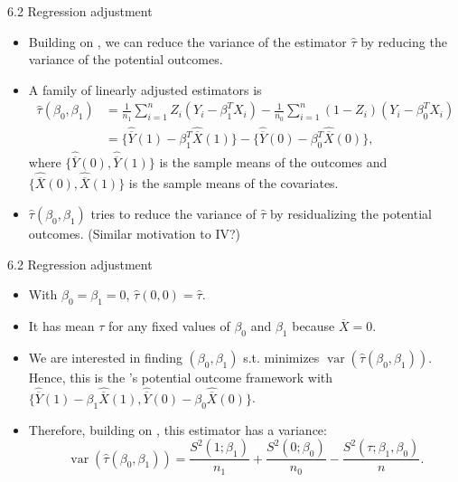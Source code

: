 \documentclass[aspectratio=169, 12pt]{beamer}
\begin{document}
\begin{frame}{6.2 Regression adjustment}
  \begin{itemize}
    \item Building on \citet{neyman1923application}, we can reduce the variance of the estimator $\widehat{\tau}$ by reducing the variance of the potential outcomes.
    \item A family of linearly adjusted estimators is 
    \begin{align*}
      \widehat{\tau}(\beta_0,\beta_1)
      &= \frac{1}{n_1}\sum_{i=1}^{n}Z_i(Y_i-\beta_1^TX_i) - \frac{1}{n_0}\sum_{i=1}^{n}(1-Z_i)(Y_i-\beta_0^TX_i)\\
      &=\{\widehat{\overline{Y}}(1)-\beta_1^T\widehat{\overline{X}}(1)\}-\{\widehat{\overline{Y}}(0)-\beta_0^T\widehat{\overline{X}}(0)\},
    \end{align*}
    where $\{\widehat{\overline{Y}}(0),\widehat{\overline{Y}}(1)\}$ is the sample means of the outcomes and $\{\widehat{\overline{X}}(0),\widehat{\overline{X}}(1)\}$ is the sample means of the covariates.
    \item $\widehat{\tau}(\beta_0,\beta_1)$ tries to reduce the variance of $\widehat{\tau}$ by residualizing the potential outcomes. (Similar motivation to IV?)
  \end{itemize}
\end{frame}

\begin{frame}{6.2 Regression adjustment}
  \begin{itemize}
    \item With $\beta_0=\beta_1=0$, $\widehat{\tau}(0,0)=\widehat{\tau}$.
    \item It has mean $\tau$ for any fixed values of $\beta_0$ and $\beta_1$ because $\overline{X}=0$.
    \item We are interested in finding $(\beta_0,\beta_1)$ s.t. minimizes $\operatorname{var}(\widehat{\tau}(\beta_0,\beta_1))$. Hence, this is the \citet{neyman1923application}'s potential outcome framework with $\{\widehat{\overline{Y}}(1)-\beta_1\widehat{\overline{X}}(1),\widehat{\overline{Y}}(0)-\beta_0\widehat{\overline{X}}(0)\}$.
    \item Therefore, building on \citet{neyman1923application}, this estimator has a variance:
    \[
    \operatorname{var}(\widehat{\tau}(\beta_0,\beta_1))
    =\frac{S^2(1;\beta_1)}{n_1}+\frac{S^2(0;\beta_0)}{n_0}-\frac{S^2(\tau;\beta_1,\beta_0)}{n}.
    \]
  \end{itemize}
\end{frame}
\end{document}
